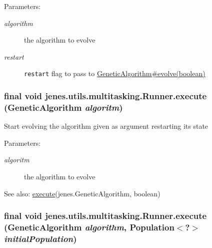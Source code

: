 \begin{Desc}
\item[Parameters:]
\begin{description}
\item[{\em algorithm}]the algorithm to evolve \item[{\em restart}]{\tt restart} flag to pass to \hyperlink{}{GeneticAlgorithm\#evolve(boolean)} \end{description}
\end{Desc}
\hypertarget{classjenes_1_1utils_1_1multitasking_1_1_runner_e222d69f44508fc432c05074272e0ae3}{
\subsubsection[execute]{\setlength{\rightskip}{0pt plus 5cm}final void jenes.utils.multitasking.Runner.execute (GeneticAlgorithm {\em algoritm})}}
\label{classjenes_1_1utils_1_1multitasking_1_1_runner_e222d69f44508fc432c05074272e0ae3}


Start evolving the algorithm given as argument restarting its state \begin{Desc}
\item[Parameters:]
\begin{description}
\item[{\em algoritm}]the algorithm to evolve \end{description}
\end{Desc}
\begin{Desc}
\item[See also:]\hyperlink{classjenes_1_1utils_1_1multitasking_1_1_runner_24d074cbd5140cd8bc65623fa1961f39}{execute}(jenes.GeneticAlgorithm, boolean) \end{Desc}
\hypertarget{classjenes_1_1utils_1_1multitasking_1_1_runner_7205f2d93d68f40e3e87dccf92cc3720}{
\subsubsection[execute]{\setlength{\rightskip}{0pt plus 5cm}final void jenes.utils.multitasking.Runner.execute (GeneticAlgorithm {\em algorithm}, \/  Population$<$?$>$ {\em initialPopulation})}}
\label{classjenes_1_1utils_1_1multitasking_1_1_runner_7205f2d93d68f40e3e87dccf92cc3720}


